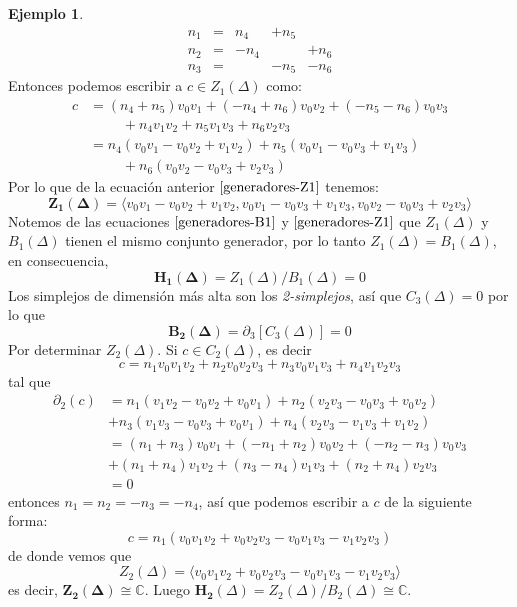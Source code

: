 \documentclass[12pt]{book}
\theoremstyle{definition}
\newtheorem{example}[theorem]{Ejemplo}
\newcounter{in}
\begin{document}
\begin{example}
\[\begin{array}{rrrrr}
   n_{1} & = & n_{4} & +n_{5} & \\
   n_{2} & = & -n_{4} &      &+n_{6} \\
   n_{3} & = &        &-n_{5}&-n_{6} 
 \end{array}\]
 Entonces podemos escribir a $c\in Z_{1}(\Delta)$ como:
 \begin{align}
   \label{generadores-Z1}
   c&=(n_{4}+n_{5})v_{0}v_{1}+(-n_{4}+n_{6})v_{0}v_{2}+(-n_{5}-n_{6})v_{0}v_{3}\nonumber\\
   &\phantom{{}=n_{4}}+n_{4}v_{1}v_{2}+n_{5}v_{1}v_{3}+n_{6}v_{2}v_{3}\nonumber\\
   &=n_{4}(v_{0}v_{1}-v_{0}v_{2}+v_{1}v_{2})+n_{5}(v_{0}v_{1}-v_{0}v_{3}+v_{1}v_{3})\nonumber\\
   &\phantom{{}=n_{4}}+n_{6}(v_{0}v_{2}-v_{0}v_{3}+v_{2}v_{3})
 \end{align}
 Por lo que de la ecuación anterior $\ref{generadores-Z1}$ tenemos:
 $$\boldsymbol{Z_{1}(\Delta)}=\langle v_{0}v_{1}-v_{0}v_{2}+v_{1}v_{2},v_{0}v_{1}-v_{0}v_{3}+v_{1}v_{3},v_{0}v_{2}-v_{0}v_{3}+v_{2}v_{3}\rangle$$
 Notemos de las ecuaciones $\ref{generadores-B1}$ y
 $\ref{generadores-Z1}$ que  $Z_{1}(\Delta)$ y $B_{1}(\Delta)$ tienen
 el mismo conjunto generador, por lo tanto
 $Z_{1}(\Delta)=B_{1}(\Delta)$, en consecuencia,
 $$\boldsymbol{H_{1}(\Delta)}=Z_{1}(\Delta)/B_{1}(\Delta)=0$$
 Los simplejos de dimensión más alta son los \emph{2-simplejos}, así
 que $C_{3}(\Delta)=0$ por lo que 
 $$\boldsymbol{B_{2}(\Delta)}=\partial_{3}[C_{3}(\Delta)]=0$$ 
 Por determinar $Z_{2}(\Delta)$. Si $c\in C_{2}(\Delta)$, es decir 
 $$c=n_{1}v_{0}v_{1}v_{2}+n_{2}v_{0}v_{2}v_{3}+n_{3}v_{0}v_{1}v_{3}+n_{4}v_{1}v_{2}v_{3}$$
 tal que
 \begin{align*}
   \partial_{2}(c)&=n_{1}(v_{1}v_{2}-v_{0}v_{2}+v_{0}v_{1})+n_{2}(v_{2}v_{3}-v_{0}v_{3}+v_{0}v_{2})\\
   &+n_{3}(v_{1}v_{3}-v_{0}v_{3}+v_{0}v_{1})+n_{4}(v_{2}v_{3}-v_{1}v_{3}+v_{1}v_{2})\\
   &=(n_{1}+n_{3})v_{0}v_{1}+(-n_{1}+n_{2})v_{0}v_{2}+(-n_{2}-n_{3})v_{0}v_{3}\\
   & +(n_{1}+n_{4})v_{1}v_{2}+(n_{3}-n_{4})v_{1}v_{3}+(n_{2}+n_{4})v_{2}v_{3}\\
   &=0
 \end{align*}
 entonces $n_{1}=n_{2}=-n_{3}=-n_{4}$, así que podemos escribir a $c$
 de la siguiente forma: 
 $$c=n_{1}(v_{0}v_{1}v_{2}+v_{0}v_{2}v_{3}-v_{0}v_{1}v_{3}-v_{1}v_{2}v_{3})$$
 de donde vemos que
 $$Z_{2}(\Delta)=\langle v_{0}v_{1}v_{2}+v_{0}v_{2}v_{3}-v_{0}v_{1}v_{3}-v_{1}v_{2}v_{3}\rangle$$
 es decir, $\boldsymbol{Z_{2}(\Delta)}\cong \mathbb{C}$. Luego  $\boldsymbol{H_{2}}(\Delta)=Z_{2}(\Delta)/B_{2}(\Delta)\cong\mathbb{C}$.
\end{example}
\end{document}
